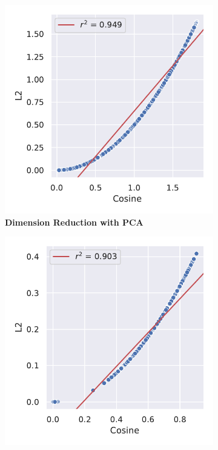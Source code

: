 \begin{figure}
    \begin{adjustbox}{minipage=\dimexpr{}\fboxrule,fbox}
        \begin{subfigure}[b]{0.475\textwidth}
            \includegraphics[width=\textwidth]{PCA/Difference_Distance_Calculation.pdf}
            \caption[Dimension Reduction with PCA]{\textbf{Dimension Reduction with PCA}}
            \label{fig:2.4.2a}
        \end{subfigure}
        \hfill
        \begin{subfigure}[b]{0.475\textwidth}
            \includegraphics[width=\textwidth]{UMAP/Difference_Distance_Calculation.pdf}

\end{subfigure}
\end{adjustbox}
\end{figure}
